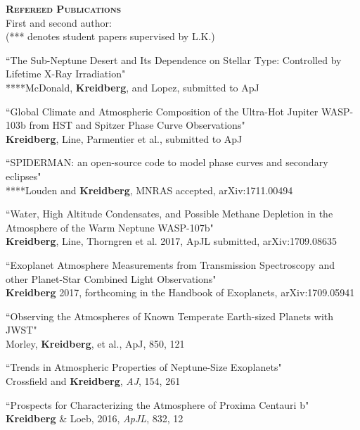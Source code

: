 \documentclass[12pt,letterpaper]{article}
\begin{document}
\textbf{\textsc{Refereed Publications}} \\
\vspace{1mm}
\hspace*{5mm}First and second author: \\
\hspace*{5mm}(*** denotes student papers supervised by L.K.)
\begin{compactenum}
\item``The Sub-Neptune Desert and Its Dependence on Stellar Type: Controlled by Lifetime X-Ray Irradiation"\\
****McDonald, \textbf{Kreidberg}, and Lopez, submitted to ApJ

\item ``Global Climate and Atmospheric Composition of the Ultra-Hot Jupiter WASP-103b from HST and Spitzer Phase Curve Observations"\\
\textbf{Kreidberg}, Line, Parmentier et al., submitted to ApJ

\item ``SPIDERMAN: an open-source code to model phase curves and secondary eclipses"\\
****Louden and \textbf{Kreidberg}, MNRAS accepted, arXiv:1711.00494

\item ``Water, High Altitude Condensates, and Possible Methane Depletion in the Atmosphere of the Warm Neptune WASP-107b"\\
\textbf{Kreidberg}, Line, Thorngren et al. 2017, ApJL submitted, arXiv:1709.08635

\item ``Exoplanet Atmosphere Measurements from Transmission Spectroscopy and other Planet-Star Combined Light Observations"\\
\textbf{Kreidberg} 2017, forthcoming in the Handbook of Exoplanets, arXiv:1709.05941

\item ``Observing the Atmospheres of Known Temperate Earth-sized Planets with JWST"\\
Morley, \textbf{Kreidberg}, et al., ApJ, 850, 121 

\item ``Trends in Atmospheric Properties of Neptune-Size Exoplanets"\\
Crossfield and \textbf{Kreidberg}, \textit{AJ}, 154, 261 

\item ``Prospects for Characterizing the Atmosphere of Proxima Centauri b"\\
\textbf{Kreidberg} \& Loeb, 2016, \textit{ApJL}, 832, 12 


\end{compactenum}
\end{document}
